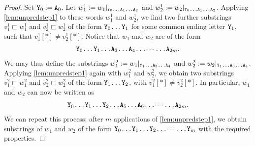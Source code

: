 \documentclass[11pt]{amsart}
\theoremstyle{definition}
\newcommand{\upletters}[1]{{\normalfont{\texttt{#1}}}}
\newcommand{\makesubscript}[1]{\textsubscript{$#1$}}
\newcommand{\letters}[1]{#1[*]}
\begin{document}
\begin{proof}
Set $\upletters{Y\makesubscript{0}} := \upletters{A\makesubscript{0}}$. Let $w_1^{1} := w_1|_{\upletters{Y\makesubscript{0}\ldots A\makesubscript{1}\ldots A\makesubscript{2}}}$  and $w_2^1 := w_2|_{\upletters{Y\makesubscript{0}\ldots A\makesubscript{1}\ldots A\makesubscript{2}}}$. Applying \cref{lem:unpredstep1} to these words $w_1^{1}$ and $w_2^{1}$, we find two further substrings $v_1^1 \sqsubset w_1^1$ and $v_2^1 \sqsubset w_2^1$ of the form $\upletters{Y\makesubscript{0}\ldots Y\makesubscript{1}}$ for some common ending letter $\upletters{Y\makesubscript{1}}$, such that $\letters{v_1^1} \neq \letters{v_2^1}$. Notice that $w_1$ and $w_2$ are of the form 
\begin{equation*}
\upletters{Y\makesubscript{0}\ldots Y\makesubscript{1}\ldots A\makesubscript{3}\ldots A\makesubscript{4}\ldots$\cdots$\ldots A\makesubscript{2m}}.
\end{equation*}
We may thus define the substrings $w_1^2 := w_1|_{\upletters{Y\makesubscript{1}\ldots A\makesubscript{3}\ldots A\makesubscript{4}}}$ and $w_2^2 := w_2|_{\upletters{Y\makesubscript{1}\ldots A\makesubscript{3}\ldots A\makesubscript{4}}}$. Applying \cref{lem:unpredstep1} again with $w_1^2$ and $w_2^2$, we obtain two substrings $v_1^2 \sqsubset w_1^2$ and $v_2^2 \sqsubset w_2^2$ of the form $\upletters{Y\makesubscript{1}\ldots Y\makesubscript{2}}$, with $\letters{v_1^2} \neq \letters{v_2^2}$. In particular, $w_1$ and $w_2$ can now be written as
\begin{equation*}
\upletters{Y\makesubscript{0}\ldots Y\makesubscript{1}\ldots Y\makesubscript{2}\ldots A\makesubscript{5}\ldots A\makesubscript{6}\ldots$\cdots$\ldots A\makesubscript{2m}}.
\end{equation*}
We can repeat this process; after $m$ applications of \cref{lem:unpredstep1}, we obtain substrings of $w_1$ and $w_2$ of the form $\upletters{Y\makesubscript{0}\ldots Y\makesubscript{1}\ldots Y\makesubscript{2}\ldots$\cdots$\ldots Y\makesubscript{m}}$ with the required properties.
\end{proof}
\end{document}
